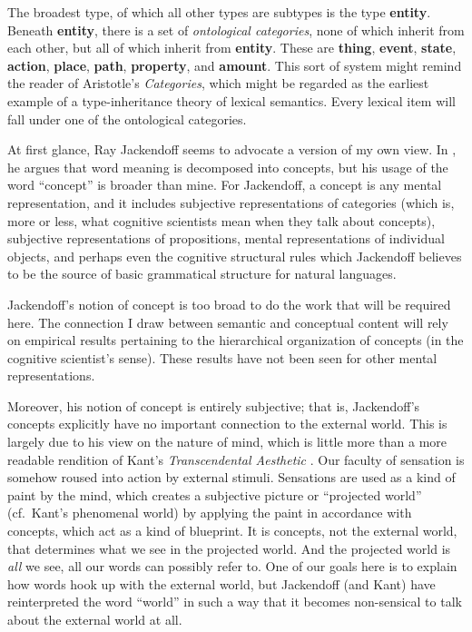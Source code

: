 The broadest type, of which all other types are subtypes is the type {\bf entity}. Beneath {\bf entity}, there is a set of \emph{ontological categories}, none of which inherit from each other, but all of which inherit from {\bf entity}. These are {\bf thing}, {\bf event}, {\bf state}, {\bf action}, {\bf place}, {\bf path}, {\bf property}, and {\bf amount}. This sort of system might remind the reader of Aristotle's \emph{Categories}, which might be regarded as the earliest example of a type-inheritance theory of lexical semantics. Every lexical item will fall under one of the ontological categories.

At first glance, Ray Jackendoff seems to advocate a version of my own view. In \cite{jackendoff_semantics_1983}, he argues that word meaning is decomposed into concepts, but his usage of the word ``concept'' is broader than mine. For Jackendoff, a concept is any mental representation, and it includes subjective representations of categories (which is, more or less, what cognitive scientists mean when they talk about concepts), subjective representations of propositions, mental representations of individual objects, and perhaps even the cognitive structural rules which Jackendoff believes to be the source of basic grammatical structure for natural languages.

Jackendoff's notion of concept is too broad to do the work that will be required here. The connection I draw between semantic and conceptual content will rely on empirical results pertaining to the hierarchical organization of concepts (in the cognitive scientist's sense). These results have not been seen for other mental representations.

Moreover, his notion of concept is entirely subjective; that is, Jackendoff's concepts explicitly have no important connection to the external world. This is largely due to his view on the nature of mind, which is little more than a more readable rendition of Kant's \emph{Transcendental Aesthetic} \cite[Ch. 2]{jackendoff_semantics_1983}. Our faculty of sensation is somehow roused into action by external stimuli. Sensations are used as a kind of paint by the mind, which creates a subjective picture or ``projected world'' (cf.\ Kant's phenomenal world) by applying the paint in accordance with concepts, which act as a kind of blueprint. It is concepts, not the external world, that determines what we see in the projected world. And the projected world is \emph{all} we see, all our words can possibly refer to. One of our goals here is to explain how words hook up with the external world, but Jackendoff (and Kant) have reinterpreted the word ``world'' in such a way that it becomes non-sensical to talk about the external world at all.


